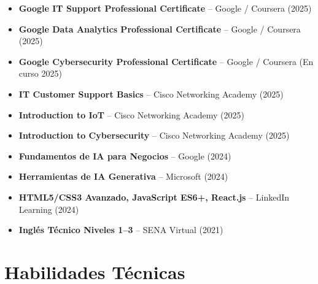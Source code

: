 \documentclass[10pt, letterpaper]{article}
\begin{document}
\begin{itemize}
  \item \textbf{Google IT Support Professional Certificate} – Google / Coursera (2025)
  \item \textbf{Google Data Analytics Professional Certificate} – Google / Coursera (2025)
  \item \textbf{Google Cybersecurity Professional Certificate} – Google / Coursera (En curso 2025)
  \item \textbf{IT Customer Support Basics} – Cisco Networking Academy (2025)
  \item \textbf{Introduction to IoT} – Cisco Networking Academy (2025)
  \item \textbf{Introduction to Cybersecurity} – Cisco Networking Academy (2025)
  \item \textbf{Fundamentos de IA para Negocios} – Google (2024)
  \item \textbf{Herramientas de IA Generativa} – Microsoft (2024)
  \item \textbf{HTML5/CSS3 Avanzado, JavaScript ES6+, React.js} – LinkedIn Learning (2024)
  \item \textbf{Inglés Técnico Niveles 1–3} – SENA Virtual (2021)
\end{itemize}

\section{Habilidades Técnicas}
\end{document}
